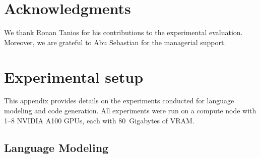 \documentclass{article}
\begin{document}
\section*{Acknowledgments}
%
We thank Ronan Tanios for his contributions to the experimental evaluation.
%
Moreover, we are grateful to Abu Sebastian for the managerial support.








\newpage
\tableofcontents 

\appendix
\section{Experimental setup}
This appendix provides details on the experiments conducted for language modeling and code generation. 
%
All experiments were run on a compute node with 1--8 NVIDIA A100 GPUs, each with 80~Gigabytes of VRAM.


\subsection{Language Modeling}\label{app:finetuning-mdlm}
\end{document}
